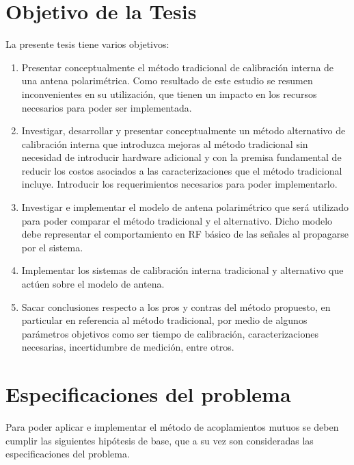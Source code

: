 \section{Objetivo de la Tesis} \label{sc:objective}

La presente tesis tiene varios objetivos:

\begin{enumerate}
    \item Presentar conceptualmente el método tradicional de calibración interna de una antena polarimétrica. Como resultado
		de este estudio se resumen inconvenientes en su utilización, que tienen un impacto en los recursos necesarios para poder ser
		implementada. 
    \item Investigar, desarrollar y presentar conceptualmente un método alternativo de calibración interna que introduzca
		mejoras al método tradicional sin necesidad de introducir hardware adicional y con la premisa fundamental de
		reducir los costos asociados a las caracterizaciones que el método tradicional incluye. Introducir los
		requerimientos necesarios para poder implementarlo.
    \item Investigar e implementar el modelo de antena polarimétrico que será utilizado para poder comparar el 
		método tradicional y el alternativo. Dicho modelo debe representar el comportamiento en RF básico de las señales al 
		propagarse por el sistema.
    \item Implementar los sistemas de calibración interna tradicional y alternativo que actúen sobre el modelo de antena. 
    \item Sacar conclusiones respecto a los pros y contras del método propuesto, en particular en referencia al método
		tradicional, por medio de algunos parámetros objetivos como ser tiempo de calibración, caracterizaciones necesarias,
		incertidumbre de medición, entre otros.
\end{enumerate}


\section{Especificaciones del problema} \label{sc:specifications}

Para poder aplicar e implementar el método de acoplamientos mutuos se deben cumplir las siguientes hipótesis de base, que a su
vez son consideradas las especificaciones del problema.

